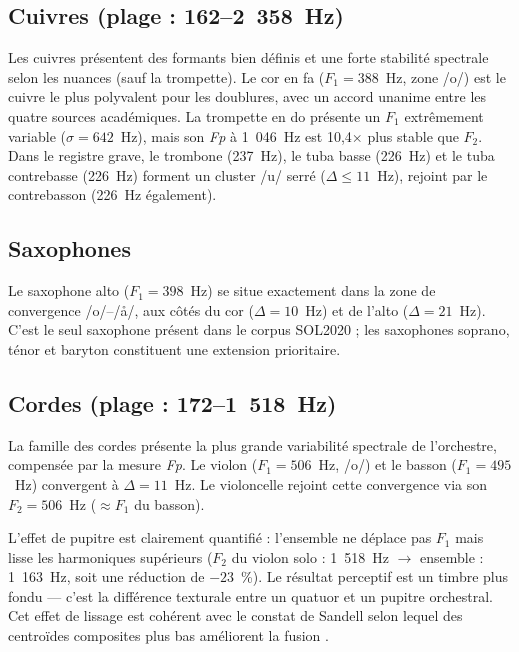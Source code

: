 \documentclass[12pt,a4paper]{article}
\begin{document}
\subsection{Cuivres (plage : 162--2~358~Hz)}

Les cuivres présentent des formants bien définis et une forte stabilité spectrale selon
les nuances (sauf la trompette). Le cor en fa ($F_1 = 388$~Hz, zone /o/) est le cuivre
le plus polyvalent pour les doublures, avec un accord unanime entre les quatre sources
académiques. La trompette en do présente un $F_1$ extrêmement variable ($\sigma = 642$~Hz),
mais son \textit{Fp} à 1~046~Hz est 10,4$\times$ plus stable que $F_2$. Dans le registre
grave, le trombone (237~Hz), le tuba basse (226~Hz) et le tuba contrebasse (226~Hz)
forment un cluster /u/ serré ($\Delta \leq 11$~Hz), rejoint par le contrebasson (226~Hz également).

\subsection{Saxophones}

Le saxophone alto ($F_1 = 398$~Hz) se situe exactement dans la zone de convergence
/o/--/\aa/, aux côtés du cor ($\Delta = 10$~Hz) et de l'alto ($\Delta = 21$~Hz). C'est
le seul saxophone présent dans le corpus SOL2020 ; les saxophones soprano, ténor et
baryton constituent une extension prioritaire.

\subsection{Cordes (plage : 172--1~518~Hz)}

La famille des cordes présente la plus grande variabilité spectrale de l'orchestre,
compensée par la mesure \textit{Fp}. Le violon ($F_1 = 506$~Hz, /o/) et le basson
($F_1 = 495$~Hz) convergent à $\Delta = 11$~Hz. Le violoncelle rejoint cette convergence
via son $F_2 = 506$~Hz ($\approx F_1$ du basson).

L'effet de pupitre est clairement quantifié : l'ensemble ne déplace pas $F_1$ mais lisse
les harmoniques supérieurs ($F_2$ du violon solo : 1~518~Hz $\rightarrow$ ensemble :
1~163~Hz, soit une réduction de $-23$~\%). Le résultat perceptif est un timbre plus
fondu --- c'est la différence texturale entre un quatuor et un pupitre orchestral. Cet
effet de lissage est cohérent avec le constat de Sandell selon lequel des centroïdes
composites plus bas améliorent la fusion \citep{Sandell1995}.
\end{document}
